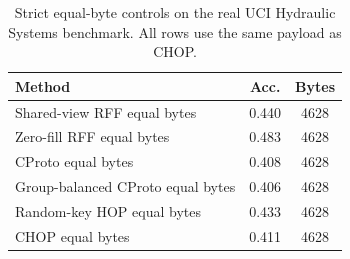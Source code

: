 \begin{table}[t]
\centering
\caption{Strict equal-byte controls on the real UCI Hydraulic Systems benchmark. All rows use the same payload as CHOP.}
\label{tab:strict-equal-byte-hydraulic}
\begin{tabular}{lcc}
\toprule
Method & Acc. & Bytes \\
\midrule
Shared-view RFF equal bytes & 0.440 & 4628 \\
Zero-fill RFF equal bytes & 0.483 & 4628 \\
CProto equal bytes & 0.408 & 4628 \\
Group-balanced CProto equal bytes & 0.406 & 4628 \\
Random-key HOP equal bytes & 0.433 & 4628 \\
CHOP equal bytes & 0.411 & 4628 \\
\bottomrule
\end{tabular}
\end{table}
